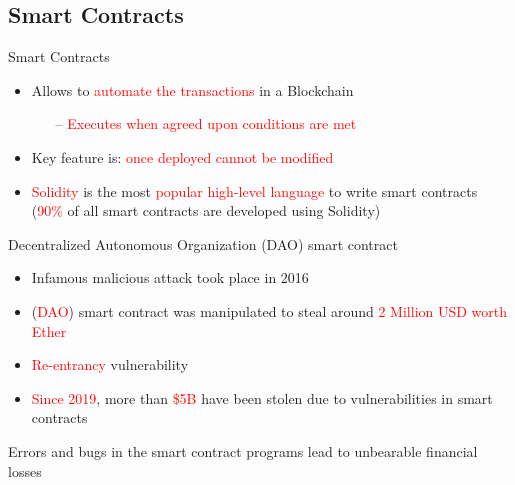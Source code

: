 \documentclass[aspectratio=169]{beamer}
\begin{document}
\subsection{Smart Contracts}
\begin{frame}{Smart Contracts}

 \begin{itemize}

\item Allows to \textcolor{red}{automate the transactions} in a Blockchain
\begin{itemize}
\item[--] \textcolor{red}{Executes when agreed upon conditions are met}
\end{itemize}
\item Key feature is: \textcolor{red}{once deployed cannot be modified}
\item \textcolor{red}{Solidity} is the most \textcolor{red}{popular high-level language} to write smart contracts (\textcolor{red}{90\%} of all smart contracts are developed using Solidity)
\end{itemize}
\end{frame}
%
\begin{frame}{Decentralized Autonomous Organization (DAO) smart contract}

 \begin{itemize}
\item Infamous malicious attack took place in 2016 
\item (\textcolor{red}{DAO}) smart contract was manipulated to steal around \textcolor{red}{2 Million USD worth Ether}
\item \textcolor{red}{Re-entrancy} vulnerability
\item \textcolor{red}{Since 2019}, more than \textcolor{red}{\$5B} have been stolen due to vulnerabilities
in smart contracts
\end{itemize}
\vspace{0.5in}
\begin{exampleblock}{}
  {\large \begin{center}Errors and bugs in the smart contract programs lead to unbearable financial losses \end{center}}
\end{exampleblock}
\end{frame}
\end{document}
